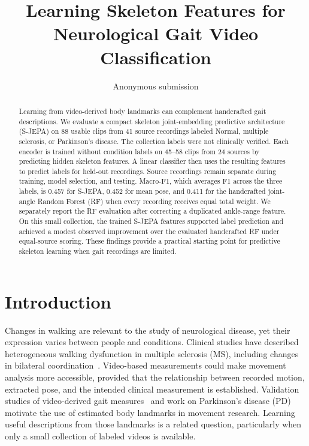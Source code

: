 \documentclass[10pt,twocolumn,letterpaper]{article}
\title{Learning Skeleton Features for Neurological Gait Video Classification}
\author{Anonymous submission}
\begin{document}
\maketitle
\begin{abstract}
Learning from video-derived body landmarks can complement handcrafted gait descriptions. We evaluate a compact skeleton joint-embedding predictive architecture (S-JEPA) on 88 usable clips from 41 source recordings labeled Normal, multiple sclerosis, or Parkinson's disease. The collection labels were not clinically verified. Each encoder is trained without condition labels on 45--58 clips from 24 sources by predicting hidden skeleton features. A linear classifier then uses the resulting features to predict labels for held-out recordings. Source recordings remain separate during training, model selection, and testing. Macro-F1, which averages F1 across the three labels, is 0.457 for S-JEPA, 0.452 for mean pose, and 0.411 for the handcrafted joint-angle Random Forest (RF) when every recording receives equal total weight. We separately report the RF evaluation after correcting a duplicated ankle-range feature. On this small collection, the trained S-JEPA features supported label prediction and achieved a modest observed improvement over the evaluated handcrafted RF under equal-source scoring. These findings provide a practical starting point for predictive skeleton learning when gait recordings are limited.
\end{abstract}

\section{Introduction}
Changes in walking are relevant to the study of neurological disease, yet their expression varies between people and conditions. Clinical studies have described heterogeneous walking dysfunction in multiple sclerosis (MS), including changes in bilateral coordination~\cite{filli2018,plotnik2020}. Video-based measurements could make movement analysis more accessible, provided that the relationship between recorded motion, extracted pose, and the intended clinical measurement is established. Validation studies of video-derived gait measures~\cite{stenum2021,stenum2024} and work on Parkinson's disease (PD)~\cite{shin2021} motivate the use of estimated body landmarks in movement research. Learning useful descriptions from those landmarks is a related question, particularly when only a small collection of labeled videos is available.
\end{document}
